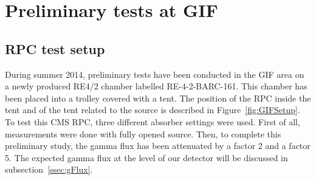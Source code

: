 		

\section{Preliminary tests at GIF}
\label{sec:GIFtests}
				
	\subsection{\acl{RPC} test setup}
	\label{ssec:RPCSetup}
	
		During summer 2014, preliminary tests have been conducted in the GIF area on a newly produced RE4/2 chamber labelled RE-4-2-BARC-161. This chamber has been placed into a trolley covered with a tent. The position of the RPC inside the tent and of the tent related to the source is described in Figure~\ref{fig:GIFSetup}. To test this CMS RPC, three different absorber settings were used. First of all, measurements were done with fully opened source. Then, to complete this preliminary study, the gamma flux has been attenuated by a factor 2 and a factor 5. The expected gamma flux at the level of our detector will be discussed in subsection~\ref{ssec:gFlux}.

